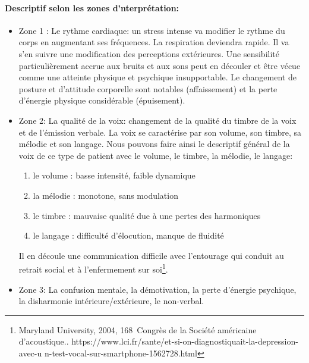       \paragraph{Descriptif selon les zones d'nterprétation:}

\begin{itemize}
  	\item Zone 1 :  Le rythme cardiaque: un stress intense va modifier le rythme
  du corps en augmentant ses fréquences. La respiration deviendra
  rapide. Il va s'en suivre une modification des perceptions
  extérieures. Une sensibilité particulièrement accrue aux bruits et
  aux sons peut en découler et être vécue comme une
  atteinte physique et psychique insupportable.
  Le changement de posture et d'attitude corporelle sont
notables (affaissement) et la perte d'énergie physique considérable (épuisement).
	\item Zone 2: La qualité de la voix: changement de la qualité du timbre de la
 voix et de l'émission verbale.	
  La voix se caractérise par son volume, son timbre, sa mélodie et son langage. 
	 Nous pouvons faire ainsi le
        descriptif général de la voix de ce type de patient avec le volume, le timbre, la
        mélodie, le langage: 
 	\begin{enumerate}
 		\item le volume : basse intensité, faible dynamique
 		\item la mélodie : monotone, sans modulation
 		\item le timbre : mauvaise qualité due à une pertes des harmoniques
 		\item le langage : difficulté d'élocution, manque de fluidité
 	\end{enumerate}
        Il en découle une communication difficile avec l'entourage qui  conduit au retrait social et à l'enfermement sur soi\footnote{Maryland University, 2004, 168\ieme\ Congrès de la Société
américaine d'acoustique.\autocite{le_service_metronews}. https://www.lci.fr/sante/et-si-on-diagnostiquait-la-depression-avec-u
n-test-vocal-sur-smartphone-1562728.html}.
        
	\item Zone 3: La confusion mentale, la démotivation, la perte d'énergie
psychique, la disharmonie intérieure/extérieure, le non-verbal.
\end{itemize}

